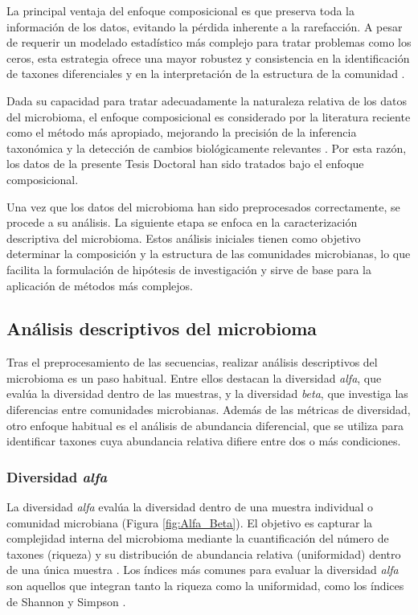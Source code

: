 La principal ventaja del enfoque composicional es que preserva toda la información de los datos, evitando la pérdida inherente a la rarefacción. A pesar de requerir un modelado estadístico más complejo para tratar problemas como los ceros, esta estrategia ofrece una mayor robustez y consistencia en la identificación de taxones diferenciales y en la interpretación de la estructura de la comunidad \cite{peterson2023analysis, gloor2016s}.

Dada su capacidad para tratar adecuadamente la naturaleza relativa de los datos del microbioma, el enfoque composicional es considerado por la literatura reciente como el método más apropiado, mejorando la precisión de la inferencia taxonómica y la detección de cambios biológicamente relevantes \cite{peterson2023analysis, schloss2024waste}. Por esta razón, los datos de la presente Tesis Doctoral han sido tratados bajo el enfoque composicional.


Una vez que los datos del microbioma han sido preprocesados correctamente, se procede a su análisis. La siguiente etapa se enfoca en la caracterización descriptiva del microbioma. Estos análisis iniciales tienen como objetivo determinar la composición y la estructura de las comunidades microbianas, lo que facilita la formulación de hipótesis de investigación y sirve de base para la aplicación de métodos más complejos.

\subsection{Análisis descriptivos del microbioma}

Tras el preprocesamiento de las secuencias, realizar análisis descriptivos del microbioma es un paso habitual. Entre ellos destacan la diversidad \textit{alfa}, que evalúa la diversidad dentro de las muestras, y la diversidad \textit{beta}, que investiga las diferencias entre comunidades microbianas. Además de las métricas de diversidad, otro enfoque habitual es el análisis de abundancia diferencial, que se utiliza para identificar taxones cuya abundancia relativa difiere entre dos o más condiciones. 

\subsubsection{Diversidad \textit{alfa}}

La diversidad \textit{alfa} evalúa la diversidad dentro de una muestra individual o comunidad microbiana (Figura \ref{fig:Alfa_Beta}). El objetivo es capturar la complejidad interna del microbioma mediante la cuantificación del número de taxones (riqueza) y su distribución de abundancia relativa (uniformidad) dentro de una única muestra \cite{finotello2018measuring}. Los índices más comunes para evaluar la diversidad \textit{alfa} son aquellos que integran tanto la riqueza como la uniformidad, como los índices de Shannon y Simpson \cite{hagerty2020empirically}.

